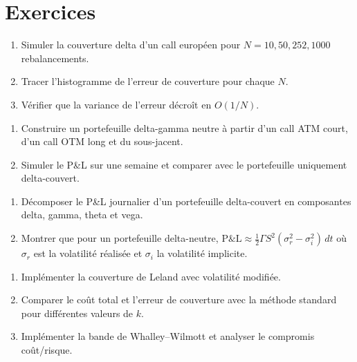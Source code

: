 \section{Exercices}

\begin{exercice}
\begin{enumerate}
    \item Simuler la couverture delta d'un call europ\'een pour
          $N = 10, 50, 252, 1000$ rebalancements.
    \item Tracer l'histogramme de l'erreur de couverture pour chaque $N$.
    \item V\'erifier que la variance de l'erreur d\'ecro\^it en $O(1/N)$.
\end{enumerate}
\end{exercice}

\begin{exercice}
\begin{enumerate}
    \item Construire un portefeuille delta-gamma neutre \`a partir d'un
          call ATM court, d'un call OTM long et du sous-jacent.
    \item Simuler le P\&L sur une semaine et comparer avec le portefeuille
          uniquement delta-couvert.
\end{enumerate}
\end{exercice}

\begin{exercice}[Analyse du P\&L]
\begin{enumerate}
    \item D\'ecomposer le P\&L journalier d'un portefeuille delta-couvert
          en composantes delta, gamma, theta et vega.
    \item Montrer que pour un portefeuille delta-neutre,
          $\text{P\&L} \approx \frac{1}{2}\Gamma S^2(\sigma_r^2 - \sigma_i^2)\,dt$
          o\`u $\sigma_r$ est la volatilit\'e r\'ealis\'ee et $\sigma_i$
          la volatilit\'e implicite.
\end{enumerate}
\end{exercice}

\begin{exercice}
\begin{enumerate}
    \item Impl\'ementer la couverture de Leland avec volatilit\'e modifi\'ee.
    \item Comparer le co\^ut total et l'erreur de couverture avec la
          m\'ethode standard pour diff\'erentes valeurs de $k$.
    \item Impl\'ementer la bande de Whalley--Wilmott et analyser le
          compromis co\^ut/risque.
\end{enumerate}
\end{exercice}
